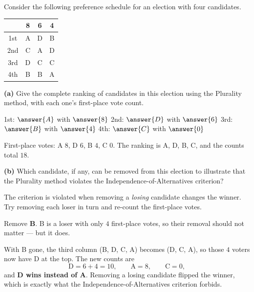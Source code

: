 \documentclass[12pt]{ximera}
\begin{document}
\begin{problem}
Consider the following preference schedule for an election with four candidates.

\begin{center}
\begin{tabular}{c|ccc}
 & 8 & 6 & 4 \\\hline
1st & A & D & B \\
2nd & C & A & D \\
3rd & D & C & C \\
4th & B & B & A
\end{tabular}
\end{center}

\begin{prompt}
\textbf{(a)} Give the complete ranking of candidates in this election using the
Plurality method, with each one's first-place vote count.

1st: $\answer{A}$ with $\answer{8}$ \quad 2nd: $\answer{D}$ with $\answer{6}$ \quad
3rd: $\answer{B}$ with $\answer{4}$ \quad 4th: $\answer{C}$ with $\answer{0}$

\begin{feedback}
First-place votes: A $8$, D $6$, B $4$, C $0$. The ranking is A, D, B, C, and the
counts total $18$. \checkmark
\end{feedback}
\end{prompt}

\begin{prompt}
\textbf{(b)} Which candidate, if any, can be removed from this election to illustrate
that the Plurality method violates the Independence-of-Alternatives criterion?

\begin{multipleChoice}
\end{multipleChoice}

\begin{hint}
The criterion is violated when removing a \emph{losing} candidate changes the winner.
Try removing each loser in turn and re-count the first-place votes.
\end{hint}

\begin{feedback}
Remove \textbf{B}. B is a loser with only $4$ first-place votes, so their removal
should not matter --- but it does.

With B gone, the third column (B, D, C, A) becomes (D, C, A), so those $4$ voters now
have D at the top. The new counts are
\[ \text{D} = 6+4 = 10, \qquad \text{A} = 8, \qquad \text{C} = 0, \]
and \textbf{D wins instead of A}. Removing a losing candidate flipped the winner, which
is exactly what the Independence-of-Alternatives criterion forbids.


\end{feedback}
\end{prompt}
\end{problem}
\end{document}
